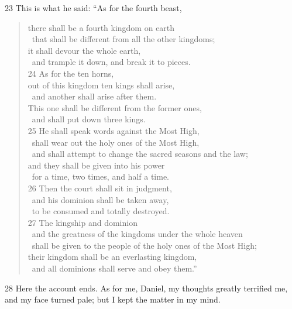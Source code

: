 23 This is what he said: ``As for the fourth beast,

\begin{verse}
there shall be a fourth kingdom on earth \\
\vgap~that shall be different from all the other kingdoms; \\
it shall devour the whole earth, \\
\vgap~and trample it down, and break it to pieces. \\
24 As for the ten horns, \\
out of this kingdom ten kings shall arise, \\
\vgap~and another shall arise after them. \\
This one shall be different from the former ones, \\
\vgap~and shall put down three kings. \\
25 He shall speak words against the Most High, \\
\vgap~shall wear out the holy ones of the Most High, \\
\vgap~and shall attempt to change the sacred seasons and the law; \\
and they shall be given into his power \\
\vgap~for a time, two times, and half a time. \\
26 Then the court shall sit in judgment, \\
\vgap~and his dominion shall be taken away, \\
\vgap~to be consumed and totally destroyed. \\
27 The kingship and dominion \\
\vgap~and the greatness of the kingdoms under the whole heaven \\
\vgap~shall be given to the people of the holy ones of the Most High; \\
their kingdom shall be an everlasting kingdom, \\
\vgap~and all dominions shall serve and obey them.'' \\
\end{verse}

28 Here the account ends. As for me, Daniel, my thoughts greatly terrified me, 
and my face turned pale; but I kept the matter in my mind.
